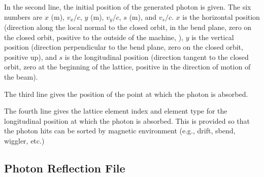 \documentclass[11pt]{article}
\begin{document}
{{In the second line, the initial position of the generated photon is
given. The six numbers are $x$ (m), $v_x/c$, $y$ (m), $v_y/c$, $s$
(m), and $v_s/c.$ $x$ is the horizontal position (direction along the
local normal to the closed orbit, in the bend plane, zero on the
closed orbit, positive to the outside of the machine, ), $y$ is the
vertical position (direction perpendicular to the bend plane, zero on
the closed orbit, positive up), and $s$ is the longitudinal position
(direction tangent to the closed orbit, zero at the beginning of the
lattice, positive in the direction of motion of the beam).

The third line gives the position of the point at which the photon is absorbed.

The fourth line gives the lattice element index and element type for
the longitudinal position at which the photon is absorbed. This is
provided so that the photon hits can be sorted by magnetic environment
(e.g., drift, sbend, wiggler, etc.)  


\subsection{Photon Reflection File}


}}
\end{document}
